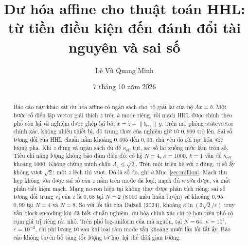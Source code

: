 \documentclass[11pt,a4paper]{article}
\title{Dư hóa affine cho thuật toán HHL:\\
từ tiền điều kiện đến đánh đổi tài nguyên và sai số}
\author{Lê Vũ Quang Minh}
\date{7 tháng 10 năm 2026}
\begin{document}
\maketitle

\noindent
{}
\vspace{0.8em}

\begin{abstract}
\color{revised}
Báo cáo này khảo sát dư hóa affine có ngân sách cho bộ giải lai của hệ \(Ax=b\).
Một bước cổ điển lập vector giải thích \(z\) trên \(k\) mode riêng, rồi mạch HHL được chỉnh theo phổ còn lại và nghiệm được ghép lại bởi \(x=z+\lVert b_{\mathrm{res}}\rVert\, y\).
Trên mô phỏng statevector chính xác, không nhiễu thiết bị, độ trung thực của nghiệm giữ từ \(0{,}999\) trở lên.
Sai số tương đối của HHL chuẩn nằm khoảng \(0{,}005\) đến \(0{,}06\), chủ yếu do rời rạc hóa ước lượng pha.
Khi \(z\) đúng và ngân sách đủ để \(\kappa_{\mathrm{eff}}\) tụt, sai số lai xuống mức làm tròn số.
Tiêu chí năng lượng không bảo đảm điều đó: có hệ \(N=4\), \(\kappa=1000\), \(k=1\) vẫn để \(\kappa_{\mathrm{eff}}\) khoảng \(1000\).
Không chứng minh chặn \(\Lambda_z\le\sqrt{2}\).
Trên một triệu hệ với \(z\) đúng, tỉ số ấy không vượt \(\sqrt{2}\); một \(z\) lệch thì vượt. Đó là số đo, ghi ở Mục~\ref{sec:million}.
Mạch thu hẹp không sửa được sai số của \(z\) nằm trên mode đã loại; mạch đủ \(\kappa\) sửa được, và mất phần tiết kiệm mạch.
Mạng nơ-ron hiện tại không thay được phân tích riêng: sai số tương đối trung vị của \(z\) là \(0{,}68\) tại \(N=2\) (8\,000 mẫu huấn luyện) và khoảng \(0{,}95\)--\(0{,}99\) tại \(N=4\) và \(N=8\).
So với lối tắt của Dalzell (2024), khoảng \(\kappa\ln(2\sqrt{2}/\varepsilon)\) truy vấn block-encoding khi đã biết chuẩn nghiệm, dư hóa chính xác chỉ rẻ hơn trên phổ có cụm giá trị riêng rất nhỏ.
Trên phổ log-uniform của mã nguồn, tại \(N=64\), \(\kappa=10^{4}\), \(\varepsilon=10^{-2}\), chi phí lượng tử sau khi loại tám mode vẫn khoảng mười lần lối tắt ấy.
Báo cáo không tuyên bố tăng tốc lượng tử hay lợi thế thời gian tường.
\end{abstract}
\end{document}

